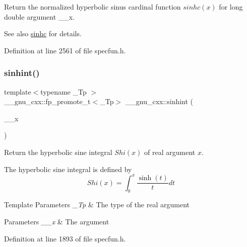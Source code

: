 Return the normalized hyperbolic sinus cardinal function $ sinhc(x) $ for {\ttfamily long double} argument {\ttfamily \+\_\+\+\_\+x}.

\begin{DoxySeeAlso}{See also}
\hyperlink{group__gnu__math__spec__func_gaf2f02e4143e7beb97352cef4b7fcb663}{sinhc} for details. 
\end{DoxySeeAlso}


Definition at line 2561 of file specfun.\+h.

\mbox{\label{group__gnu__math__spec__func_gab5cbc831c5fab99a967c03d059f1ad59}} 
\subsubsection{\texorpdfstring{sinhint()}{sinhint()}}
{\footnotesize\ttfamily template$<$typename \+\_\+\+Tp $>$ \\
\+\_\+\+\_\+gnu\+\_\+cxx\+::fp\+\_\+promote\+\_\+t$<$\+\_\+\+Tp$>$ \+\_\+\+\_\+gnu\+\_\+cxx\+::sinhint (\begin{DoxyParamCaption}\item[{\+\_\+\+Tp}]{\+\_\+\+\_\+x }\end{DoxyParamCaption})\hspace{0.3cm}{\ttfamily [inline]}}

Return the hyperbolic sine integral $ Shi(x) $ of real argument $ x $.

The hyperbolic sine integral is defined by \[ Shi(x) = \int_0^x \frac{\sinh(t)}{t}dt \]


\begin{DoxyTemplParams}{Template Parameters}
{\em \+\_\+\+Tp} & The type of the real argument \\
\hline
\end{DoxyTemplParams}

\begin{DoxyParams}{Parameters}
{\em \+\_\+\+\_\+x} & The argument \\
\hline
\end{DoxyParams}


Definition at line 1893 of file specfun.\+h.

\mbox{\label{group__gnu__math__spec__func_ga375ca3ceb1eafd678e298d0aea4bb3e6}} 
